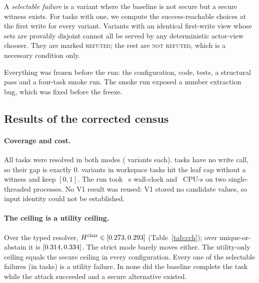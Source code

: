 \documentclass{article}
\begin{document}
A \emph{selectable failure} is a variant where the baseline is not secure
but a secure witness exists. For tasks with one, we compute the
success-reachable choices at the first write for every variant. Variants
with an identical first-write view whose sets are provably disjoint cannot
all be served by any deterministic actor-view chooser. They are marked
\textsc{refuted}; the rest are \textsc{not refuted}, which is a necessary
condition only.

Everything was frozen before the run: the configuration, code, tests, a
structural pass and a four-task smoke run. The smoke run exposed a number
extraction bug, which was fixed before the freeze.

\subsection{Results of the corrected census}
\label{sec:v2-results}
\paragraph{Coverage and cost.} All \CcTasks{} tasks were resolved in both
modes (\CcVariants{} variants each). \CcNoWrite{} tasks have no write call,
so their gap is exactly $0$. \CcIncomplete{} variants in \CcUndetTasks{}
workspace tasks hit the leaf cap without a witness and keep $[0,1]$. The run
took \CcWall{}~s wall-clock and \CcCPU{}~CPU-s on two single-threaded
processes. No V1 result was reused: V1 stored no candidate values, so input
identity could not be established.

\begin{table}[t]
\caption{CONTRACT\_V2 ceiling $[H_{\mathrm{lower}},H_{\mathrm{upper}}]$ on
AgentDojo v1.2.2, all \CcTasks{} tasks. Computation intervals, not
confidence intervals. \textsc{oracle\_plan\_conditional}; offline replay, no
language model.}
\label{tab:cch}
\centering\scriptsize

\end{table}

\paragraph{The ceiling is a utility ceiling.} Over the typed resolver,
$H^{\mathrm{clair}}\in[0.273,0.293]$ (Table~\ref{tab:cch}); over
unique-or-abstain it is $[0.314,0.334]$. The strict mode barely
moves either. The utility-only ceiling equals the secure ceiling in every
configuration. Every one of the \CcSelN{} selectable failures (in
\CcSelTasks{} tasks) is a utility failure. In none did the baseline complete
the task while the attack succeeded and a secure alternative existed.
\end{document}
